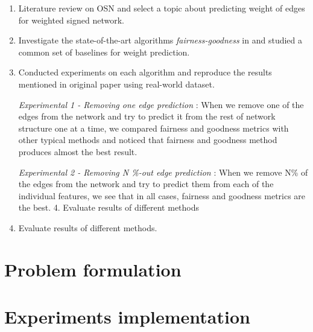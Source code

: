 \documentclass{article}
\begin{document}
\begin{enumerate}
	\item Literature review on OSN and select a topic about predicting weight of edges for weighted signed network.
	
	\item Investigate the state-of-the-art algorithms \emph{fairness-goodness} in\cite{kumar2016edge} and  studied a common set of baselines for weight prediction.
	
	\item Conducted experiments on each algorithm and reproduce the results mentioned in original paper using real-world dataset.
	
	\emph{Experimental 1 -   Removing one edge prediction} : When we remove one of the edges from the network and try to predict it from the rest of network structure one at a time, we compared fairness and goodness metrics with other typical methods and noticed that fairness and goodness method produces almost the best result. 
	
	\emph{Experimental 2 -  Removing N \%-out edge prediction} : When we remove N\% of the edges from the network and try to predict them from each of the individual features, we see that in all cases, fairness and goodness metrics are the best.
	4. Evaluate results of different methods
	
	
	\item Evaluate results of different methods.
\end{enumerate}

\section{Problem formulation}

\section{Experiments implementation}

















\end{document}

